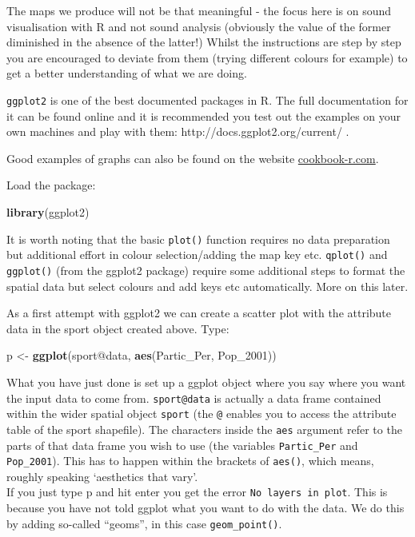 \documentclass[]{article}
\newenvironment{Shaded}{}{}
\newcommand{\KeywordTok}[1]{\textcolor[rgb]{0.00,0.44,0.13}{\textbf{{#1}}}}
\newcommand{\NormalTok}[1]{{#1}}
\begin{document}
The maps we produce will not be that meaningful - the focus here is on
sound visualisation with R and not sound analysis (obviously the value
of the former diminished in the absence of the latter!) Whilst the
instructions are step by step you are encouraged to deviate from them
(trying different colours for example) to get a better understanding of
what we are doing.

\texttt{ggplot2} is one of the best documented packages in R. The full
documentation for it can be found online and it is recommended you test
out the examples on your own machines and play with them:
http://docs.ggplot2.org/current/ .

Good examples of graphs can also be found on the website
\href{http://www.cookbook-r.com/Graphs/}{cookbook-r.com}.

Load the package:

\begin{Shaded}
\begin{Highlighting}[]
\KeywordTok{library}\NormalTok{(ggplot2)}
\end{Highlighting}
\end{Shaded}
It is worth noting that the basic \texttt{plot()} function requires no
data preparation but additional effort in colour selection/adding the
map key etc. \texttt{qplot()} and \texttt{ggplot()} (from the ggplot2
package) require some additional steps to format the spatial data but
select colours and add keys etc automatically. More on this later.

As a first attempt with ggplot2 we can create a scatter plot with the
attribute data in the sport object created above. Type:

\begin{Shaded}
\begin{Highlighting}[]
\NormalTok{p <- }\KeywordTok{ggplot}\NormalTok{(sport@data, }\KeywordTok{aes}\NormalTok{(Partic_Per, Pop_2001))}
\end{Highlighting}
\end{Shaded}
What you have just done is set up a ggplot object where you say where
you want the input data to come from. \texttt{sport@data} is actually a
data frame contained within the wider spatial object \texttt{sport} (the
\texttt{@} enables you to access the attribute table of the sport
shapefile). The characters inside the \texttt{aes} argument refer to the
parts of that data frame you wish to use (the variables
\texttt{Partic\_Per} and \texttt{Pop\_2001}). This has to happen within
the brackets of \texttt{aes()}, which means, roughly speaking
`aesthetics that vary'.\\If you just type p and hit enter you get the
error \texttt{No layers in plot}. This is because you have not told
ggplot what you want to do with the data. We do this by adding so-called
``geoms'', in this case \texttt{geom\_point()}.
\end{document}
